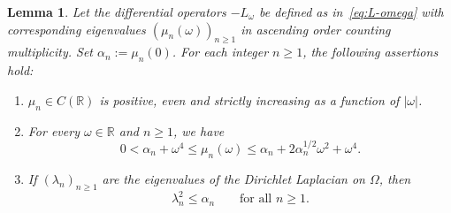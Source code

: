 \documentclass[a4paper, reqno,titlepage]{amsart}
\numberwithin{equation}{section}
\theoremstyle{plain}
\newtheorem{lemma}[theorem]{Lemma}
\theoremstyle{definition}
\theoremstyle{remark}
\newcommand{\RR}{\mathbb{R}}
\begin{document}
\begin{lemma}
  \label{lem:mu-omegas}
  Let the differential operators $-L_\omega$ be defined as in~\eqref{eq:L-omega} with corresponding eigenvalues $(\mu_n(\omega))_{n \ge 1}$ in ascending order counting multiplicity. Set $\alpha_n := \mu_n(0)$. For each integer $n \ge 1$, the following assertions hold:
  \begin{enumerate}[\upshape (i)]
  \item $\mu_n\in C(\RR)$ is positive, even and strictly increasing as a function of $|\omega|$.
  \item For every $\omega \in \RR$ and $n\geq 1$, we have
    \begin{equation*}
      0
      <\alpha_n + \omega^4
      \leq \mu_n(\omega)
      \leq \alpha_n + 2 \alpha_n^{1/2} \omega^2 + \omega^4.
    \end{equation*}
  \item If $(\lambda_n)_{n\geq 1}$ are the eigenvalues of the Dirichlet Laplacian on $\Omega$, then
    \begin{equation}
      \label{eq:DL-biharmonic}
      \lambda_n^2 \leq \alpha_n \qquad \text{for all } n \ge 1.
    \end{equation}
  \end{enumerate}
\end{lemma}
\end{document}
